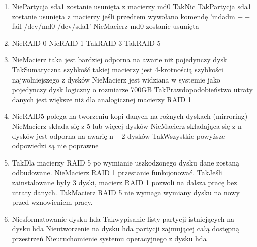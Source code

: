 \begin{enumerate}
		\newpage
		\item {}%
		{Nie}{Partycja sda1 zostanie usunięta z macierzy md0}%
		{Tak}{Nic}%
		{Tak}{Partycja sda1 zostanie usunięta z macierzy jeśli przedtem wywołano komendę 'mdadm $ -- $fail /dev/md0 /dev/sda1'}%
		{Nie}{Macierz md0 zostanie usunięta}
		\item {}%
		{Nie}{RAID 0}%
		{Nie}{RAID 1}%
		{Tak}{RAID 3}%
		{Tak}{RAID 5}
		\item {}%
		{Nie}{Macierz taka jest bardziej odporna na awarie niż pojedynczy dysk}%
		{Tak}{Sumaryczna szybkość takiej macierzy jest 4-krotnością szybkości najwolniejszego z dysków}%
		{Nie}{Macierz jest widziana w systemie jako pojedynczy dysk logiczny o rozmiarze 700GB}%
		{Tak}{Prawdopodobieństwo utraty danych jest większe niż dla analogicznej macierzy RAID 1}
		\item {}%
		{Nie}{RAID5 polega na tworzeniu kopi danych na rożnych dyskach (mirroring)}%
		{Nie}{Macierz składa się z 5 lub więcej dysków}%
		{Nie}{Macierz składająca się z n dysków jest odporna na awarię n – 2 dysków}%
		{Tak}{Wszystkie powyższe odpowiedzi są nie poprawne}
		\item {}%
		{Tak}{Dla macierzy RAID 5 po wymianie uszkodzonego dysku dane zostaną odbudowane.}%
		{Nie}{Macierz RAID 1 przestanie funkcjonować.}%
		{Tak}{Jeśli zainstalowane były 3 dyski, macierz RAID 1 pozwoli na dalsza pracę bez utraty danych.}%
		{Tak}{Macierz RAID 5 nie wymaga wymiany dysku na nowy przed wznowieniem pracy.}
		\item {}%
		{Nie}{sformatowanie dysku hda}%
		{Tak}{wypisanie listy partycji istniejących na dysku hda}%
		{Nie}{utworzenie na dysku hda partycji zajmującej całą dostępną przestrzeń}%
		{Nie}{uruchomienie systemu operacyjnego z dysku hda}
		

\end{enumerate}
